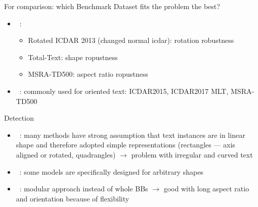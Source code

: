For comparison: which Benchmark Dataset fits the problem the best?
\begin{itemize}
    \item~\cite{liao_mask_2020}:
        \begin{itemize}
            \item Rotated ICDAR 2013 (changed normal icdar): rotation robustness
            \item Total-Text: shape ropustness
            \item MSRA-TD500: aspect ratio ropustness
        \end{itemize}
    \item~\cite{yang_learning_2021}: commonly used for oriented text: ICDAR2015, ICDAR2017 MLT,
        MSRA-TD500
\end{itemize}

Detection
\begin{itemize}
    \item~\cite{ferrari_textsnake_2018}: many methods have strong assumption that text instances are
        in linear shape and therefore adopted simple representations (rectangles --- axis aligned
        or rotated, quadrangles) $\rightarrow$ problem with irregular and curved text
    \item~\cite{ferrari_textsnake_2018}: some models are specifically designed for arbitrary shapes
    \item~\cite{shi_detecting_2017}: modular approach instead of whole \acp{BB}
        $\rightarrow$ good with long aspect ratio and orientation because of flexibility
\end{itemize}

